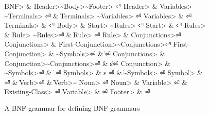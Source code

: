 \begin{figure}
  \begin{Grammar}
    \begin{aligned}
      \<BNF>                & \Derives \<Header>\~\<Body>\~\<Footer> \hfill⏎
      \<Header>             & \Derives \<Variables> \~\<Terminals> \hfill⏎
      {}                    & \| \<Terminals> \~\<Variables> \hfill⏎
      \<Variables>          & \Derives {}\hfill⏎
      \<Terminals>          & \Derives {}\hfill⏎
      \<Body>               & \Derives \<Start> \~\<Rules> \hfill⏎
      \<Start>              & \Derives {} \hfill⏎
      \<Rules>              & \Derives \<Rule> \~\<Rules>\hfill⏎
      {}                    & \| \<Rule> \hfill⏎
      \<Rule>               & \Derives {} \<Conjunctions>\hfill⏎
      \<Conjunctions>       & \Derives \<First-Conjunction>\~\<Conjunctions>\hfill⏎
      \<First-Conjunction>  & \Derives {}\~\<Symbols>\hfill⏎
      {}                    & \| \hfill⏎
      \<Conjunctions> & \Derives \<Conjunction>\~\<Conjunctions>\hfill⏎
      {}                    & \| ε\hfill⏎
      \<Conjunction>  & \Derives {}\~\<Symbols>\hfill⏎
      {}                    & \|  \hfill⏎
      \<Symbols>    & \Derives ε \hfill⏎
      {}                    & \| \~\<Symbols> \hfill⏎
      \<Symbol>             & \Derives {} \hfill⏎
      {}                    & \| \<Verb>\hfill⏎
      {}                    & \| \<Verb>\~\cc{,} \<Noun> \hfill⏎
      \<Noun>               & \Derives \<Variable> \hfill⏎
      {}                    & \| \<Existing-Class> \hfill⏎
      \<Variable>           & \Derives {} \hfill⏎
      \<Footer>             & \Derives {}\hfill⏎
    \end{aligned}
  \end{Grammar}
  \caption{A BNF grammar for defining BNF grammars}
  \label{figure:BNF:BNF}
\end{figure}
